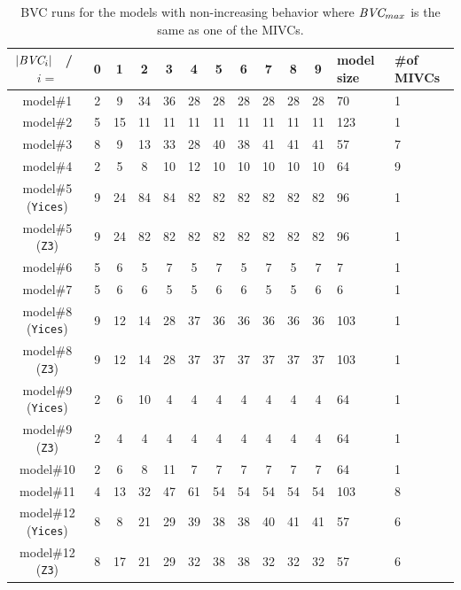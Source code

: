 \begin{table}
  \caption{BVC runs for the models with non-increasing behavior where $\textit{BVC} _{max}$ is the same as one of the MIVCs.}

  \centering
  \begin{tabularx}{\linewidth}{ |c||c|c|c|c|c|c|c|c|c|c||L|L|}
    \hline
    $|\textit{BVC} _{i}|$ ~/~ $i=$ & 0 & 1 & 2 & 3 & 4 & 5 & 6 & 7 & 8 & 9 & \small{model size} & \small{\#of MIVCs} \\[0.5ex]
    \hline\hline

    model\#1& 2 & 9 & 34 & 36& 28 & 28 & 28 & 28 & 28 & 28 & 70&1 \\[0.5ex]
    model\#2& 5 & 15 & 11& 11& 11 & 11 & 11 & 11 & 11 & 11 & 123 &1\\[0.5ex]
    model\#3& 8 & 9& 13& 33& 28& 40& 38& 41& 41& 41&57 &7 \\[0.5ex]
    model\#4& 2& 5& 8& 10& 12& 10& 10& 10& 10& 10 &64 &9\\[0.5ex]
    \small{model\#5 (\texttt{Yices})}&9& 24 & 84& 84& 82& 82& 82& 82& 82& 82&96 &1\\[0.5ex]
    \small{model\#5 (\texttt{Z3})}& 9& 24& 82& 82& 82& 82& 82& 82& 82& 82&96 &1\\[0.5ex]
    model\#6& 5& 6& 5& 7& 5& 7& 5& 7& 5& 7& 7 &1\\[0.5ex]
    model\#7& 5& 6& 6& 5& 5& 6& 6& 5& 5& 6&6 &1\\[0.5ex]
    \small{model\#8 (\texttt{Yices})}& 9& 12& 14& 28& 37& 36& 36& 36& 36& 36&103&1 \\[0.5ex]
    \small{model\#8 (\texttt{Z3})}&9& 12& 14& 28& 37& 37& 37& 37& 37& 37& 103&1\\[0.5ex]
    \small{model\#9 (\texttt{Yices})}& 2& 6& 10& 4& 4& 4& 4& 4& 4& 4 &64&1 \\[0.5ex]
    \small{model\#9 (\texttt{Z3})}& 2& 4& 4& 4& 4& 4& 4& 4& 4& 4 &64&1\\[0.5ex]
    model\#10& 2& 6& 8& 11& 7& 7& 7& 7& 7& 7 &64&1\\[0.5ex]
    model\#11& 4& 13& 32& 47& 61& 54& 54& 54& 54& 54 &103&8 \\[0.5ex]
 \small{model\#12 (\texttt{Yices})}& 8& 8& 21& 29& 39& 38& 38& 40& 41& 41&57&6\\[0.5ex]
  \small{model\#12 (\texttt{Z3})}& 8& 17& 21& 29& 32& 38& 38& 32& 32& 32&57&6 \\[0.5ex]
    \hline
  \end{tabularx} \\

\end{table}
